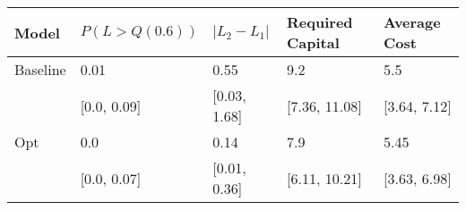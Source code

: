 \begin{tabular}{lllll}
\toprule
   Model & $P(L > Q(0.6))$ & $|L_2 - L_1|$ & Required Capital & Average Cost \\
\midrule
Baseline &            0.01 &          0.55 &              9.2 &          5.5 \\
         &     [0.0, 0.09] &  [0.03, 1.68] &    [7.36, 11.08] & [3.64, 7.12] \\
     Opt &             0.0 &          0.14 &              7.9 &         5.45 \\
         &     [0.0, 0.07] &  [0.01, 0.36] &    [6.11, 10.21] & [3.63, 6.98] \\
\bottomrule
\end{tabular}
